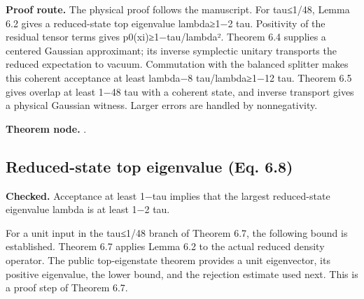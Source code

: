 \textbf{Proof route.} The physical proof follows the manuscript. For tau≤1/48, Lemma 6.2 gives a reduced-state top eigenvalue lambda≥1−2 tau. Positivity of the residual tensor terms gives p0(xi)≥1−tau/lambda². Theorem 6.4 supplies a centered Gaussian approximant; its inverse symplectic unitary transports the reduced expectation to vacuum. Commutation with the balanced splitter makes this coherent acceptance at least lambda−8 tau/lambda≥1−12 tau. Theorem 6.5 gives overlap at least 1−48 tau with a coherent state, and inverse transport gives a physical Gaussian witness. Larger errors are handled by nonnegativity.


\textbf{Theorem node.} .

\subsection{Reduced-state top eigenvalue (Eq. 6.8)}\label{paper:boson-top-eigenvalue}
\textbf{Checked.} Acceptance at least 1−tau implies that the largest reduced-state eigenvalue lambda is at least 1−2 tau. 

For a unit input in the tau≤1/48 branch of Theorem 6.7, the following bound is established. Theorem 6.7 applies Lemma 6.2 to the actual reduced density operator. The public top-eigenstate theorem provides a unit eigenvector, its positive eigenvalue, the lower bound, and the rejection estimate used next. This is a proof step of Theorem 6.7.

